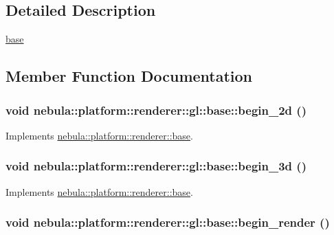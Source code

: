 \subsection{Detailed Description}
\hyperlink{classnebula_1_1platform_1_1renderer_1_1gl_1_1base}{base} 

\subsection{Member Function Documentation}
\hypertarget{classnebula_1_1platform_1_1renderer_1_1gl_1_1base_aa41ad5ca7c94ba066c7e9ee99574d4ef}{
\subsubsection[{begin\_\-2d}]{\setlength{\rightskip}{0pt plus 5cm}void nebula::platform::renderer::gl::base::begin\_\-2d ()}}
\label{classnebula_1_1platform_1_1renderer_1_1gl_1_1base_aa41ad5ca7c94ba066c7e9ee99574d4ef}


Implements \hyperlink{classnebula_1_1platform_1_1renderer_1_1base_a80e8a44929910992d3c3d831978be14e}{nebula::platform::renderer::base}.\hypertarget{classnebula_1_1platform_1_1renderer_1_1gl_1_1base_aade6306589ca7fea773433e8f2ac2e52}{
\subsubsection[{begin\_\-3d}]{\setlength{\rightskip}{0pt plus 5cm}void nebula::platform::renderer::gl::base::begin\_\-3d ()}}
\label{classnebula_1_1platform_1_1renderer_1_1gl_1_1base_aade6306589ca7fea773433e8f2ac2e52}


Implements \hyperlink{classnebula_1_1platform_1_1renderer_1_1base_a2028e1c00c65bec5ded87373048d939d}{nebula::platform::renderer::base}.\hypertarget{classnebula_1_1platform_1_1renderer_1_1gl_1_1base_a992eba193eb6f08eea3f22363ff5ee18}{
\subsubsection[{begin\_\-render}]{\setlength{\rightskip}{0pt plus 5cm}void nebula::platform::renderer::gl::base::begin\_\-render ()}}
\label{classnebula_1_1platform_1_1renderer_1_1gl_1_1base_a992eba193eb6f08eea3f22363ff5ee18}


